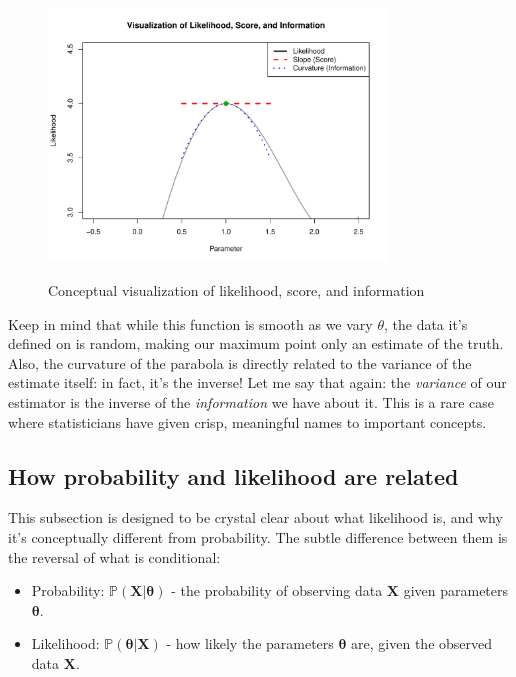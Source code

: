 \documentclass{article}
\begin{document}
\begin{figure}[H]
    \centering
    \includegraphics[width=0.8\textwidth]{likelihood_plot.pdf}
    \label{fig:likelihood_plot}
    \caption{Conceptual visualization of likelihood, score, and information}
\end{figure}

Keep in mind that while this function is smooth as we vary $\theta$, the data it's defined on is random, making our maximum point only an estimate of the truth. Also, the curvature of the parabola is directly related to the variance of the estimate itself: in fact, it's the inverse! Let me say that again: the \textit{variance} of our estimator is the inverse of the \textit{information} we have about it. This is a rare case where statisticians have given crisp, meaningful names to important concepts.

\subsection{How probability and likelihood are related}
This subsection is designed to be crystal clear about what likelihood is, and why it's conceptually different from probability. The subtle difference between them is the reversal of what is conditional:

\begin{itemize}
    \item Probability: $\mathbb{P}(\mathbf{X}|\boldsymbol{\theta})$ - the probability of observing data $\mathbf{X}$ given parameters $\boldsymbol{\theta}$.
    \item Likelihood: $\mathbb{P}(\boldsymbol{\theta}|\mathbf{X})$ - how likely the parameters $\boldsymbol{\theta}$ are, given the observed data $\mathbf{X}$.
\end{itemize}
\end{document}
